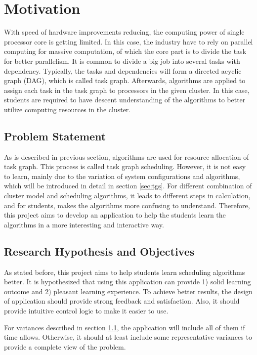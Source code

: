 \documentclass[a4paper,11pt]{article}
\begin{document}
\section{Motivation}

With speed of hardware improvements reducing, the computing power of single processor core is getting limited. In this case, the industry have to rely on parallel computing for massive computation, of which the core part is to divide the task for better parallelism. It is common to divide a big job into several tasks with dependency. Typically, the tasks and dependencies will form a directed acyclic graph (DAG), which is called task graph. Afterwards, algorithms are applied to assign each task in the task graph to processors in the given cluster. In this case, students are required to have descent understanding of the algorithms to better utilize computing resources in the cluster.

\subsection{Problem Statement} \label{sec:prob}

As is described in previous section, algorithms are used for resource allocation of task graph. This process is called task graph scheduling. However, it is not easy to learn, mainly due to the variation of system configurations and algorithms, which will be introduced in detail in section \ref{sec:tgs}. For different combination of cluster model and scheduling algorithms, it leads to different steps in calculation, and for students, makes the algorithms more confusing to understand. Therefore, this project aims to develop an application to help the students learn the algorithms in a more interesting and interactive way.

\subsection{Research Hypothesis and Objectives} \label{sec:obj}

As stated before, this project aims to help students learn scheduling algorithms better. It is hypothesized that using this application can provide 1) solid learning outcome and 2) pleasant learning experience. To achieve better results, the design of application should provide strong feedback and satisfaction. Also, it should provide intuitive control logic to make it easier to use.

For variances described in section \ref{sec:prob}, the application will include all of them if time allows. Otherwise, it should at least include some representative variances to provide a complete view of the problem.
\end{document}
